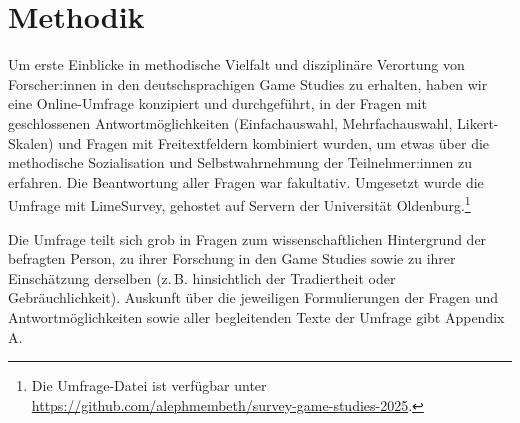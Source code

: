 \documentclass{scrartcl}
\begin{document}
\section{Methodik}\label{sec:methodik}
Um erste Einblicke in methodische Vielfalt und disziplinäre Verortung von Forscher:innen in den deutschsprachigen Game Studies zu erhalten, haben wir eine Online-Umfrage konzipiert und durchgeführt, in der Fragen mit geschlossenen Antwortmöglichkeiten (Einfachauswahl, Mehrfachauswahl, Likert-Skalen) und Fragen mit Freitextfeldern kombiniert wurden, um etwas über die methodische Sozialisation und Selbstwahrnehmung der Teilnehmer:innen zu erfahren.
Die Beantwortung aller Fragen war fakultativ.
Umgesetzt wurde die Umfrage mit LimeSurvey, \autocite[][]{limesurvey_limesurvey_nodate} gehostet auf Servern der Universität Oldenburg.\footnote{Die Umfrage-Datei ist verfügbar unter \url{https://github.com/alephmembeth/survey-game-studies-2025}.}

Die Umfrage teilt sich grob in Fragen zum wissenschaftlichen Hintergrund der befragten Person, zu ihrer Forschung in den Game Studies sowie zu ihrer Einschätzung derselben (z.\,B. hinsichtlich der Tradiertheit oder Gebräuchlichkeit).
Auskunft über die jeweiligen Formulierungen der Fragen und Antwortmöglichkeiten sowie aller begleitenden Texte der Umfrage gibt Appendix A.
\end{document}
